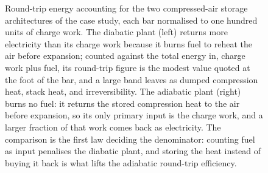 \begin{figure}[htbp]
\caption[Round-trip energy accounting for two CAES plant types]{Round-trip
energy accounting for the two compressed-air storage architectures of the
case study, each bar normalised to one hundred units of charge work. The
diabatic plant (left) returns more electricity than its charge work because
it burns fuel to reheat the air before expansion; counted against the total
energy in, charge work plus fuel, its round-trip figure is the modest value
quoted at the foot of the bar, and a large band leaves as dumped
compression heat, stack heat, and irreversibility. The adiabatic plant
(right) burns no fuel: it returns the stored compression heat to the air
before expansion, so its only primary input is the charge work, and a
larger fraction of that work comes back as electricity. The comparison is
the first law deciding the denominator: counting fuel as input penalises
the diabatic plant, and storing the heat instead of buying it back is what
lifts the adiabatic round-trip efficiency.}
\label{fig:vol04ch01:caes-sankey}
\end{figure}
